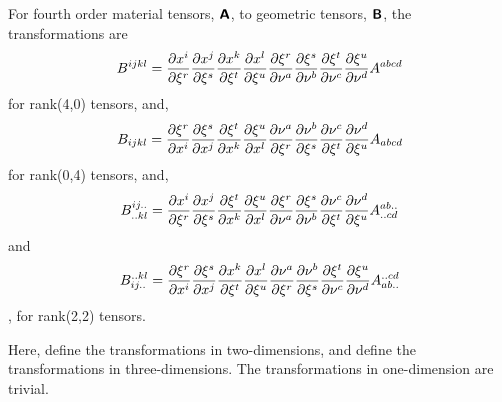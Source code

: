 For fourth order material tensors, $\boldsymbol{\mathsf{A}}$, to geometric
tensors, $\boldsymbol{\mathsf{B}}$, the transformations are
\begin{equation}
  B^{ijkl}= \dfrac{\partial x^{i}}{\partial \xi^{r}}  \dfrac{\partial x^{j}}{\partial \xi^{s}}  \dfrac{\partial x^{k}}{\partial \xi^{t}}  \dfrac{\partial x^{l}}{\partial \xi^{u}} 
   \dfrac{\partial \xi^{r}}{\partial \nu^{a}}  \dfrac{\partial \xi^{s}}{\partial \nu^{b}}  \dfrac{\partial \xi^{t}}{\partial \nu^{c}}  \dfrac{\partial \xi^{u}}{\partial \nu^{d}} A^{abcd}
\end{equation}
for rank(4,0) tensors, and,
\begin{equation}
  B_{ijkl}= \dfrac{\partial \xi^{r}}{\partial x^{i}}  \dfrac{\partial \xi^{s}}{\partial x^{j}}  \dfrac{\partial \xi^{t}}{\partial x^{k}}  \dfrac{\partial \xi^{u}}{\partial x^{l}} 
   \dfrac{\partial \nu^{a}}{\partial \xi^{r}}  \dfrac{\partial \nu^{b}}{\partial \xi^{s}}  \dfrac{\partial \nu^{c}}{\partial \xi^{t}}  \dfrac{\partial \nu^{d}}{\partial \xi^{u}} A_{abcd}
\end{equation}
for rank(0,4) tensors, and,
\begin{equation}
  B^{ij..}_{..kl}= \dfrac{\partial x^{i}}{\partial \xi^{r}}  \dfrac{\partial x^{j}}{\partial \xi^{s}}  \dfrac{\partial \xi^{t}}{\partial x^{k}}  \dfrac{\partial \xi^{u}}{\partial x^{l}} 
   \dfrac{\partial \xi^{r}}{\partial \nu^{a}}  \dfrac{\partial \xi^{s}}{\partial \nu^{b}}  \dfrac{\partial \nu^{c}}{\partial \xi^{t}}  \dfrac{\partial \nu^{d}}{\partial \xi^{u}} A^{ab..}_{..cd}
\end{equation}
and
\begin{equation}
  B^{..kl}_{ij..}= \dfrac{\partial \xi^{r}}{\partial x^{i}}  \dfrac{\partial \xi^{s}}{\partial x^{j}}  \dfrac{\partial x^{k}}{\partial \xi^{t}}  \dfrac{\partial x^{l}}{\partial \xi^{u}} 
   \dfrac{\partial \nu^{a}}{\partial \xi^{r}}  \dfrac{\partial \nu^{b}}{\partial \xi^{s}}  \dfrac{\partial \xi^{t}}{\partial \nu^{c}}  \dfrac{\partial \xi^{u}}{\partial \nu^{d}} A^{..cd}_{ab..}
\end{equation}
\etc, for rank(2,2) tensors.

Here,
define the transformations in two-dimensions, and
define the transformations in three-dimensions. The transformations in one-dimension are trivial.
